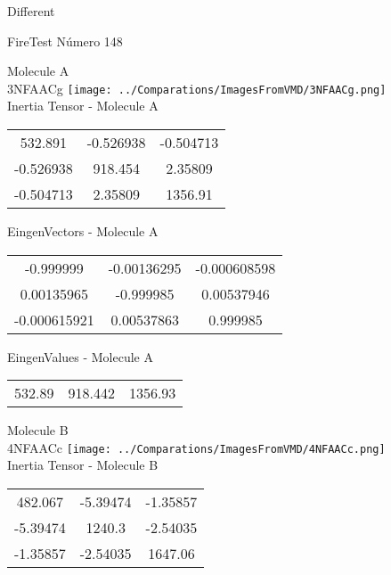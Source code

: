 \begin{center}
\vtab
\vtab
\textcolor{NavyBlue}{\Large Different}
\end{center}

 \newpage

\vtab[-2cm]
\begin{center}
{\large FireTest \tab Número 148}
\end{center}
\begin{multicols}{2}
\begin{center}

Molecule A \\ 
3NFAACg
\texttt{[image: ../Comparations/ImagesFromVMD/3NFAACg.png]}
\\
Inertia Tensor - Molecule A \\
\vtab

\begin{tabular}{|c c c|}
532.891	 & 	-0.526938	 & 	-0.504713	 \\
-0.526938	 & 	918.454	 & 	2.35809	 \\
-0.504713	 & 	2.35809	 & 	1356.91
\end{tabular}

\vtab
 EingenVectors - Molecule A     \\
\vtab
\begin{tabular}{|c c c|}
-0.999999	 & 	-0.00136295	 & 	-0.000608598	 \\
0.00135965	 & 	-0.999985	 & 	0.00537946	 \\
-0.000615921	 & 	0.00537863	 & 	0.999985
\end{tabular}

\vtab
 EingenValues - Molecule A     \\
\vtab
\begin{tabular}{|c c c|}
532.89	 & 	918.442	 & 	1356.93	 \\
\end{tabular}
\columnbreak

Molecule B \\ 
4NFAACc
\texttt{[image: ../Comparations/ImagesFromVMD/4NFAACc.png]}
\\
Inertia Tensor - Molecule B \\
\vtab

\begin{tabular}{|c c c|}
482.067	 & 	-5.39474	 & 	-1.35857	 \\
-5.39474	 & 	1240.3	 & 	-2.54035	 \\
-1.35857	 & 	-2.54035	 & 	1647.06
\end{tabular}


\end{center}
\end{multicols}
